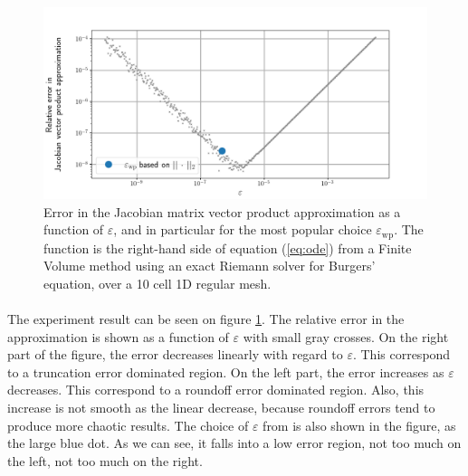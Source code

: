       \begin{figure}
        \centering
        \includegraphics[width=\textwidth]{figures/epsilon_Burgers_10.png}
        \caption{
          Error in the Jacobian matrix vector product approximation as a function of $\varepsilon$, and in particular for the most popular choice $\varepsilon_\textrm{wp}$.
          The function is the right-hand side of equation (\ref{eq:ode}) from a Finite Volume method using an exact Riemann solver for Burgers' equation, over a 10 cell 1D regular mesh.
        }
        \label{fig:epsilon_burgers_10}
      \end{figure}

      \paragraph{}
      The experiment result can be seen on figure \ref{fig:epsilon_burgers_10}.
      The relative error in the approximation is shown as a function of $\varepsilon$ with small gray crosses.
      On the right part of the figure, the error decreases linearly with regard to $\varepsilon$.
      This correspond to a truncation error dominated region.
      On the left part, the error increases as $\varepsilon$ decreases.
      This correspond to a roundoff error dominated region.
      Also, this increase is not smooth as the linear decrease, because roundoff errors tend to produce more chaotic results.
      The choice of $\varepsilon$ from \cite{PerniceWalker1998} is also shown in the figure, as the large blue dot.
      As we can see, it falls into a low error region, not too much on the left, not too much on the right.

